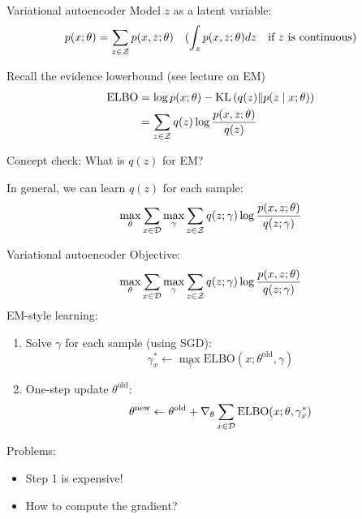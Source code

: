 \documentclass[usenames,dvipsnames,notes]{beamer}
\begin{document}
\begin{frame}
    {Variational autoencoder}
    Model $z$ as a latent variable: $$p(x;\theta) = \sum_{z\in\mathcal{Z}} p(x, z;\theta)
    \quad (\int_z p(x,z;\theta)dz \quad \text{if $z$ is continuous})
    $$

    Recall the evidence lowerbound (see lecture on EM)
    \begin{align*}
        \text{ELBO} &= \log p(x; \theta) - \text{KL}\left( q(z) \| p(z\mid x;\theta) \right) \\
        &= \sum_{z\in\mathcal{Z}} q(z)\log \frac{p(x,z;\theta)}{q(z)}
    \end{align*}

    Concept check: What is $q(z)$ for EM?

    In general, we can learn $q(z)$ for each sample:
    $$
    \max_\theta \sum_{x\in\mathcal{D}} \max_\gamma \sum_{z\in\mathcal{Z}} q(z;\gamma)\log \frac{p(x,z;\theta)}{q(z;\gamma)}
    $$
\end{frame}

\begin{frame}
    {Variational autoencoder}
    Objective:
    $$
    \max_\theta \sum_{x\in\mathcal{D}} \max_\gamma \sum_{z\in\mathcal{Z}} q(z;\gamma)\log \frac{p(x,z;\theta)}{q(z;\gamma)}
    $$
    EM-style learning:\\
    \begin{enumerate}
        \item Solve $\gamma$ for each sample (using SGD):
            $$\gamma^*_x \leftarrow \max_\gamma \text{ELBO}(x;\theta^{\text{old}}, \gamma)$$ 
        \item One-step update $\theta^{\text{old}}$:
            $$\theta^{\text{new}} \leftarrow \theta^{\text{old}} + \nabla_\theta\sum_{x\in\mathcal{D}}\text{ELBO}(x;\theta, \gamma^*_x)$$
    \end{enumerate}
    Problems:\\
    \begin{itemize}
        \item Step 1 is expensive!
        \item How to compute the gradient?
    \end{itemize}
\end{frame}
\end{document}
